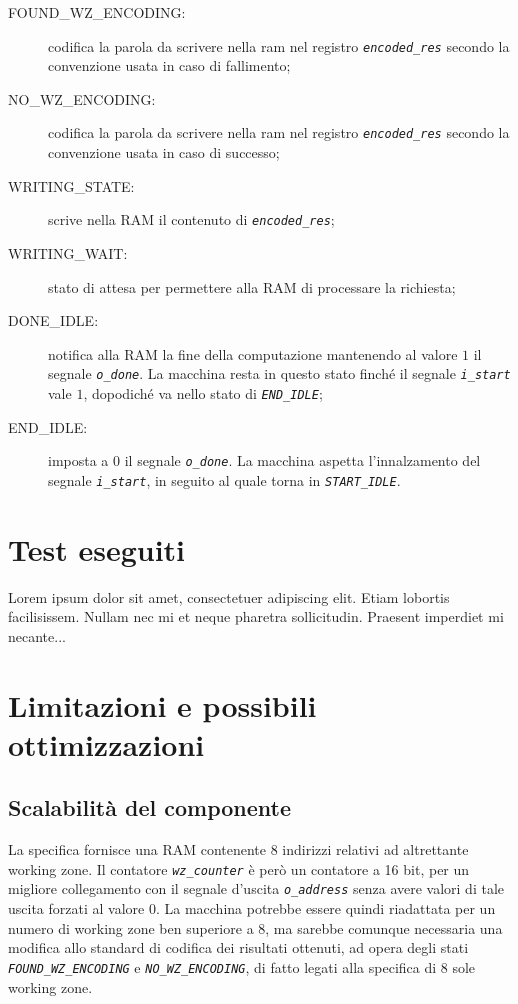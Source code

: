 \documentclass[12pt,a4paper,titlepage]{article}
\begin{document}
\begin{description}
		\item[FOUND\_WZ\_ENCODING:]	codifica la parola da scrivere nella ram nel registro \textit{\texttt{encoded\_res}} secondo 										la convenzione usata in caso di fallimento;
		\item[NO\_WZ\_ENCODING:]	codifica la parola da scrivere nella ram nel registro \textit{\texttt{encoded\_res}} secondo 										la convenzione usata in caso di successo;
		\item[WRITING\_STATE:]		scrive nella RAM il contenuto di \textit{\texttt{encoded\_res}};
		\item[WRITING\_WAIT:]		stato di attesa per permettere alla RAM di processare la richiesta;
		\item[DONE\_IDLE:]			notifica alla RAM la fine della computazione mantenendo al valore $1$ il segnale \textit{\texttt{o\_done}}. La macchina resta in questo stato finché il segnale \textit{\texttt{i\_start}} vale $1$, dopodiché va nello stato di \textit{\texttt{END\_IDLE}};
		\item[END\_IDLE:]			imposta a $0$ il segnale \textit{\texttt{o\_done}}. La macchina aspetta l'innalzamento del segnale \textit{\texttt{i\_start}}, in seguito al quale torna in \textit{\texttt{START\_IDLE}}.
		\end{description}
		
	\section{Test eseguiti} \label{sec:test}
       
		Lorem ipsum dolor sit amet, consectetuer adipiscing elit.  
		Etiam lobortis facilisissem.  Nullam nec mi et neque pharetra 
		sollicitudin.  Praesent imperdiet mi necante...
	\section{Limitazioni e possibili ottimizzazioni}
		\subsection{Scalabilità del componente}
			La specifica fornisce una RAM contenente 8 indirizzi relativi ad altrettante working zone. Il contatore \textit{\texttt{wz\_counter}} è però un contatore a 16 bit, per un migliore collegamento con il segnale d'uscita \textit{\texttt{o\_address}} senza avere valori di tale uscita forzati al valore $0$. La macchina potrebbe essere quindi riadattata per un numero di working zone ben superiore a 8, ma sarebbe comunque necessaria una modifica allo standard di codifica dei risultati ottenuti, ad opera degli stati \textit{\texttt{FOUND\_WZ\_ENCODING}} e \textit{\texttt{NO\_WZ\_ENCODING}}, di fatto legati alla specifica di 8 sole working zone.
\end{document}
